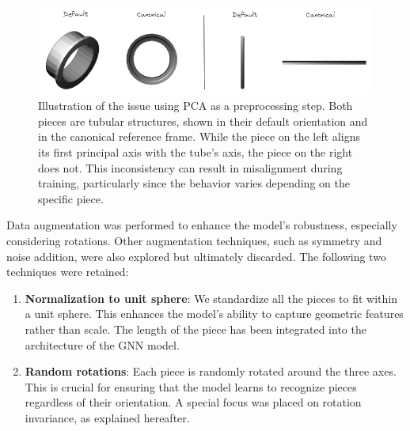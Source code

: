 \begin{figure}[]
    \centering
    \includegraphics[width=\columnwidth]{images/pca_problem.png}
    \caption{Illustration of the issue using PCA as a preprocessing step. Both pieces are tubular structures, shown in their default orientation and in the canonical reference frame. While the piece on the left aligns its first principal axis with the tube's axis, the piece on the right does not. This inconsistency can result in misalignment during training, particularly since the behavior varies depending on the specific piece.}
    \label{fig:pca_problem}
\end{figure}

Data augmentation was performed to enhance the model's robustness, especially considering rotations. Other augmentation techniques, such as symmetry and noise addition, were also explored but ultimately discarded. The following two techniques were retained:
\begin{enumerate}
    \item \textbf{Normalization to unit sphere}: We standardize all the pieces to fit within a unit sphere. This enhances the model's ability to capture geometric features rather than scale. The length of the piece has been integrated into the architecture of the GNN model.
    \item \textbf{Random rotations}: Each piece is randomly rotated around the three axes. This is crucial for ensuring that the model learns to recognize pieces regardless of their orientation. A special focus was placed on rotation invariance, as explained hereafter.
\end{enumerate}

